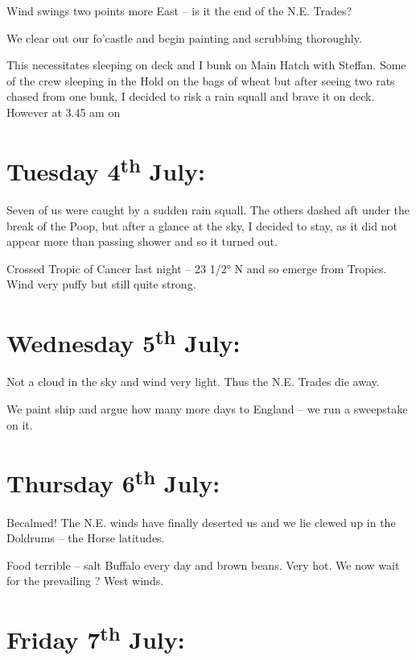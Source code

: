\documentclass[
  11pt,
  msmallroyalvopaper
]{memoir}
\begin{document}
Wind swings two points more East -- is it the end of the N.E. Trades?

We clear out our fo'castle and begin painting and scrubbing thoroughly.

This necessitates sleeping on deck and I bunk on Main Hatch with
Steffan. Some of the crew sleeping in the Hold on the bags of wheat but
after seeing two rats chased from one bunk, I decided to risk a rain
squall and brave it on deck. However at 3.45 am on

\hypertarget{tuesday-4th-july}{%
\section{\texorpdfstring{Tuesday 4\textsuperscript{th}
July:}{Tuesday 4th July:}}\label{tuesday-4th-july}}

Seven of us were caught by a sudden rain squall. The others dashed aft
under the break of the Poop, but after a glance at the sky, I decided to
stay, as it did not appear more than passing shower and so it turned
out.

Crossed Tropic of Cancer last night -- 23 1/2° N and so emerge from
Tropics. Wind very puffy but still quite strong.

\hypertarget{wednesday-5th-july}{%
\section{\texorpdfstring{Wednesday 5\textsuperscript{th}
July:}{Wednesday 5th July:}}\label{wednesday-5th-july}}

Not a cloud in the sky and wind very light. Thus the N.E. Trades die
away.

We paint ship and argue how many more days to England -- we run a
sweepstake on it.

\hypertarget{thursday-6th-july}{%
\section{\texorpdfstring{Thursday 6\textsuperscript{th}
July:}{Thursday 6th July:}}\label{thursday-6th-july}}

Becalmed! The N.E. winds have finally deserted us and we lie clewed up
in the Doldrums -- the Horse latitudes.

Food terrible -- salt Buffalo every day and brown beans. Very hot. We
now wait for the prevailing ? West winds.

\hypertarget{friday-7th-july}{%
\section{\texorpdfstring{Friday 7\textsuperscript{th}
July:}{Friday 7th July:}}\label{friday-7th-july}}
\end{document}
